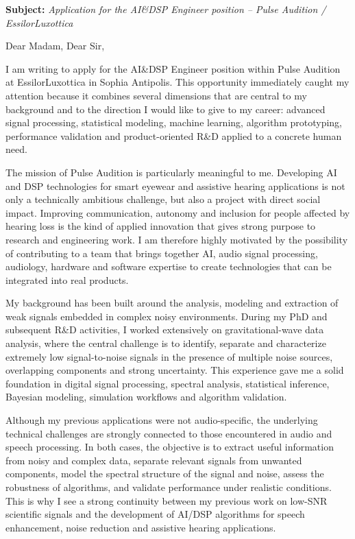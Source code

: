 \documentclass[11pt,a4paper]{altacv}
\begin{document}
\makecvheader
\vspace{-0.6cm}

\vspace{-0.4cm}

{\color{accent}\textbf{Subject:}} \textit{Application for the AI\&DSP Engineer position -- Pulse Audition / EssilorLuxottica}

{\color{body}

Dear Madam, Dear Sir,

I am writing to apply for the AI\&DSP Engineer position within Pulse Audition at EssilorLuxottica in Sophia Antipolis. This opportunity immediately caught my attention because it combines several dimensions that are central to my background and to the direction I would like to give to my career: advanced signal processing, statistical modeling, machine learning, algorithm prototyping, performance validation and product-oriented R\&D applied to a concrete human need.

The mission of Pulse Audition is particularly meaningful to me. Developing AI and DSP technologies for smart eyewear and assistive hearing applications is not only a technically ambitious challenge, but also a project with direct social impact. Improving communication, autonomy and inclusion for people affected by hearing loss is the kind of applied innovation that gives strong purpose to research and engineering work. I am therefore highly motivated by the possibility of contributing to a team that brings together AI, audio signal processing, audiology, hardware and software expertise to create technologies that can be integrated into real products.

My background has been built around the analysis, modeling and extraction of weak signals embedded in complex noisy environments. During my PhD and subsequent R\&D activities, I worked extensively on gravitational-wave data analysis, where the central challenge is to identify, separate and characterize extremely low signal-to-noise signals in the presence of multiple noise sources, overlapping components and strong uncertainty. This experience gave me a solid foundation in digital signal processing, spectral analysis, statistical inference, Bayesian modeling, simulation workflows and algorithm validation.

Although my previous applications were not audio-specific, the underlying technical challenges are strongly connected to those encountered in audio and speech processing. In both cases, the objective is to extract useful information from noisy and complex data, separate relevant signals from unwanted components, model the spectral structure of the signal and noise, assess the robustness of algorithms, and validate performance under realistic conditions. This is why I see a strong continuity between my previous work on low-SNR scientific signals and the development of AI/DSP algorithms for speech enhancement, noise reduction and assistive hearing applications.

}
\end{document}
